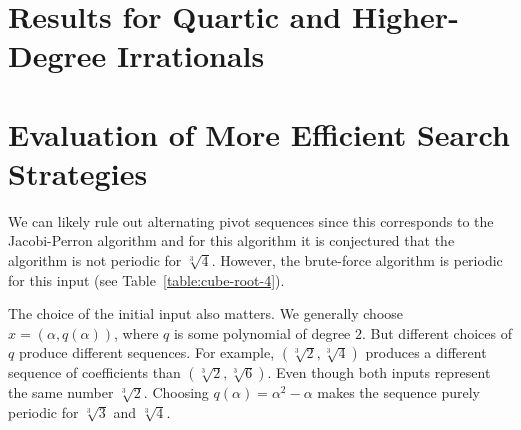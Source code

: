 \section{Results for Quartic and Higher-Degree Irrationals}

\section{Evaluation of More Efficient Search Strategies}

We can likely rule out alternating pivot sequences since this corresponds to
the Jacobi-Perron algorithm and for this algorithm it is conjectured
\cite{Karpenkov21} that the algorithm is not periodic for $\sqrt[3]{4}$.
However, the brute-force algorithm is periodic for this input (see Table~\ref{table:cube-root-4}).

The choice of the initial input also matters.
We generally choose $x = (α, q(α))$, where $q$ is some polynomial of degree $2$.
But different choices of $q$ produce different sequences.
For example, $(\sqrt[3]{2}, \sqrt[3]{4})$ produces a different sequence of coefficients than $(\sqrt[3]{2}, \sqrt[3]{6})$.
Even though both inputs represent the same number $\sqrt[3]{2}$.
Choosing $q(α) = α^2 - α$ makes the sequence purely periodic for $\sqrt[3]{3}$ and $\sqrt[3]{4}$.
